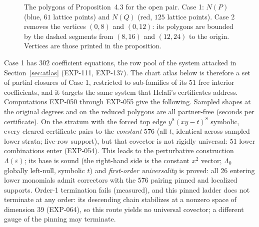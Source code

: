 \documentclass[11pt]{article}
\theoremstyle{remark}
\begin{document}
\begin{figure}[t]
\centering
{}
\caption{The polygons of Proposition~4.3 for the open pair. Case 1: $N(P)$ (blue, $61$ lattice points) and $N(Q)$ (red, $125$ lattice points). Case 2 removes the vertices $(0,8)$ and $(0,12)$: its polygons are bounded by the dashed segments from $(8,16)$ and $(12,24)$ to the origin. Vertices are those printed in the proposition.}\label{fig:polygons}
\end{figure}

Case 1 has $302$ coefficient equations, the row pool of the system attacked in
Section~\ref{sec:atlas} (EXP-111, EXP-137). The chart atlas below is therefore a set of partial closures of Case 1, restricted to
sub-families of its $51$ free interior coefficients, and it targets the same system that Helali's certificates address.
Computations EXP-050 through \mbox{EXP-055} give the following. Sampled shapes at the original degrees and on the reduced
polygons are all partner-free (seconds per certificate). On the stratum with the forced top
edge $y^8 (xy - t)^8$ symbolic, every cleared certificate pairs to the \emph{constant} $576$
(all $t$, identical across sampled lower strata; five-row support), but that covector is not
rigidly universal: 51 lower combinations enter (EXP-054). This leads to the perturbative
construction $\Lambda(\varepsilon)$; its base is sound (the right-hand side is the constant
$x^2$ vector; $\Lambda_0$ globally left-null, symbolic $t$) and \emph{first-order
universality} is proved: all 26 entering lower monomials admit correctors with the $576$
pairing pinned and localized supports. Order-1 termination fails (measured), and this pinned
ladder does not terminate at any order: its descending chain stabilizes at a nonzero space of
dimension $39$ (EXP-064), so this route yields no universal covector; a different gauge of the
pinning may terminate.
\end{document}
